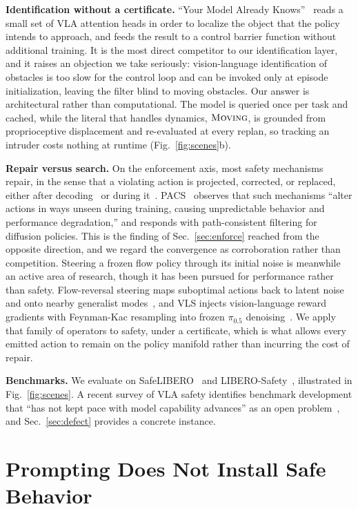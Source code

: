 \documentclass[conference]{IEEEtran}
\newcommand{\pifive}{$\pi_{0.5}$}
\begin{document}
\textbf{Identification without a certificate.} ``Your Model Already Knows''~\cite{yourmodel} reads a small set of VLA attention heads in order to localize the object that the policy intends to approach, and feeds the result to a control barrier function without additional training. It is the most direct competitor to our identification layer, and it raises an objection we take seriously: vision-language identification of obstacles is too slow for the control loop and can be invoked only at episode initialization, leaving the filter blind to moving obstacles. Our answer is architectural rather than computational. The model is queried once per task and cached, while the literal that handles dynamics, $\textsc{Moving}$, is grounded from proprioceptive displacement and re-evaluated at every replan, so tracking an intruder costs nothing at runtime (Fig.~\ref{fig:scenes}b).

\textbf{Repair versus search.} On the enforcement axis, most safety mechanisms repair, in the sense that a violating action is projected, corrected, or replaced, either after decoding~\cite{aegis} or during it~\cite{safediffuser,sota2607}. PACS~\cite{pacs} observes that such mechanisms ``alter actions in ways unseen during training, causing unpredictable behavior and performance degradation,'' and responds with path-consistent filtering for diffusion policies. This is the finding of Sec.~\ref{sec:enforce} reached from the opposite direction, and we regard the convergence as corroboration rather than competition. Steering a frozen flow policy through its initial noise is meanwhile an active area of research, though it has been pursued for performance rather than safety. Flow-reversal steering maps suboptimal actions back to latent noise and onto nearby generalist modes~\cite{frs}, and VLS injects vision-language reward gradients with Feynman-Kac resampling into frozen \pifive{} denoising~\cite{vls}. We apply that family of operators to safety, under a certificate, which is what allows every emitted action to remain on the policy manifold rather than incurring the cost of repair.

\textbf{Benchmarks.} We evaluate on SafeLIBERO~\cite{sota2607} and LIBERO-Safety~\cite{liberosafety}, illustrated in Fig.~\ref{fig:scenes}. A recent survey of VLA safety identifies benchmark development that ``has not kept pace with model capability advances'' as an open problem~\cite{vlasurvey}, and Sec.~\ref{sec:defect} provides a concrete instance.

\section{Prompting Does Not Install Safe Behavior}
\label{sec:gap}
\end{document}
